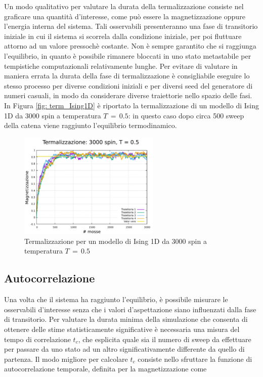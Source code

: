 Un modo qualitativo per valutare la durata della termalizzazione consiste nel graficare una quantità d'interesse, 
come può essere la magnetizzazione oppure l'energia interna del sistema. Tali osservabili presenteranno una fase di transitorio 
iniziale in cui il sistema si scorrela dalla condizione iniziale, per poi fluttuare attorno ad un valore pressochè costante. Non è 
sempre garantito che si raggiunga l'equilibrio, in quanto è possibile rimanere bloccati in uno stato metastabile per tempistiche 
computazionali relativamente lunghe. Per evitare di valutare in maniera errata la durata della fase di termalizzazione è consigliabile 
eseguire lo stesso processo per diverse condizioni iniziali e per diversi seed del generatore di numeri casuali, in modo da considerare 
diverse traiettorie nello spazio delle fasi. In Figura \ref{fig: term_Ising1D} è riportato la termalizzazione di un modello di Ising 
1D da 3000 spin a temperatura $T\,=\,0.5$: in questo caso dopo circa 500 sweep della catena viene raggiunto l'equilibrio termodinamico.

\begin{figure}[H]
    \centering
    \includegraphics[width=0.6\textwidth]{Immagini/MC_meth/term_3000_0.5.pdf}
    \caption{Termalizzazione per un modello di Ising 1D da 3000 spin a temperatura $T\,=\,0.5$}
    \label{fig: data_block_tech}
\end{figure}



\subsection{Autocorrelazione}

Una volta che il sistema ha raggiunto l'equilibrio, è possibile misurare le osservabili d'interesse senza che i valori d'aspettazione 
siano influenzati dalla fase di transitorio. Per valutare la durata minima della simulazione che consenta di ottenere delle stime 
statisticamente significative è necessaria una misura del tempo di correlazione $t_c$, che esplicita quale sia il numero di sweep 
da effettuare per passare da uno stato ad un altro significativamente differente da quello di partenza. Il modo migliore per 
calcolare $t_c$ consiste nello sfruttare la funzione di autocorrelazione temporale, definita per la magnetizzazione come 

